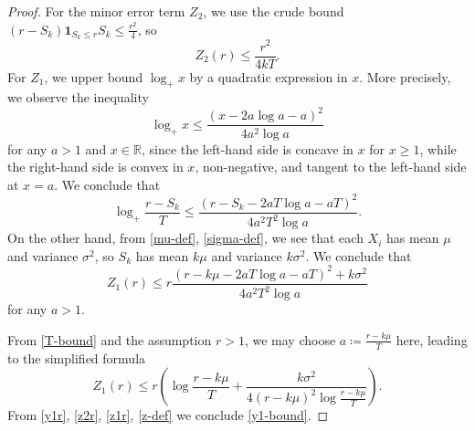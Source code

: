 \documentclass{bmcart}
\theoremstyle{plain}
\theoremstyle{definition}
\newcommand\R{\mathbb{R}}
\newcommand{\onef}{\mathbf{1}}
\begin{document}
\begin{proof}
For the minor error term $Z_2$, we use the crude bound $(r-S_k) \onef_{S_k \leq r} S_k \leq \frac{r^2}{4}$, so
\begin{equation}\label{z2r}
Z_2(r) \leq \frac{r^2}{4kT}.
\end{equation}
For $Z_1$, we upper bound $\log_+ x$ by a quadratic expression in $x$.  More precisely, we observe the inequality
$$ \log_+ x \leq \frac{(x-2a\log a-a)^2}{4a^2 \log a}$$
for any $a > 1$ and $x \in \R$, since the left-hand side is concave in $x$ for $x \geq 1$, while the right-hand side is convex in $x$, non-negative, and tangent to the left-hand side at $x=a$.  We conclude that
$$ \log_+ \frac{r-S_k}{T} \leq \frac{(r-S_k-2aT\log a-aT)^2}{4a^2 T^2 \log a}.$$
On the other hand, from \eqref{mu-def}, \eqref{sigma-def}, we see that each $X_i$ has mean $\mu$ and variance $\sigma^2$, so $S_k$ has mean $k\mu$ and variance $k\sigma^2$.  We conclude that
$$ Z_1(r) \leq r \frac{ (r-k\mu-2aT\log a-aT)^2 + k \sigma^2}{4a^2 T^2 \log a}$$
for any $a > 1$.

From \eqref{T-bound} and the assumption $r > 1$, we may choose $a \coloneqq \frac{r-k\mu}{T}$ here, leading to the simplified formula
\begin{equation}\label{z1r}
Z_1(r) \leq r \left( \log \frac{r-k\mu}{T} + \frac{k\sigma^2}{4(r-k\mu)^2 \log \frac{r-k\mu}{T}}\right).
\end{equation}
From \eqref{y1r}, \eqref{z2r}, \eqref{z1r}, \eqref{z-def} we conclude \eqref{y1-bound}.


\end{proof}
\end{document}
